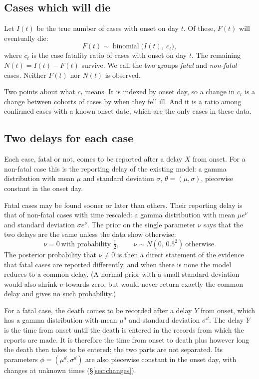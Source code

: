 \documentclass[11pt,a4paper]{article}
\newcommand{\bin}{\operatorname{binomial}}
\begin{document}
\subsection{Cases which will die}

Let $I(t)$ be the true number of cases with onset on day $t$. Of these,
$F(t)$ will eventually die:
\begin{equation}
F(t)\sim\bin\bigl(I(t),\ c_t\bigr),
\label{eq:cfr}
\end{equation}
where $c_t$ is the case fatality ratio of cases with onset on day $t$. The
remaining $N(t)=I(t)-F(t)$ survive. We call the two groups \emph{fatal} and
\emph{non-fatal} cases. Neither $F(t)$ nor $N(t)$ is observed.

Two points about what $c_t$ means. It is indexed by onset day, so a change in
$c_t$ is a change between cohorts of cases by when they fell ill. And it is a
ratio among confirmed cases with a known onset date, which are the only cases
in these data.

\subsection{Two delays for each case}

Each case, fatal or not, comes to be reported after a delay $X$ from onset.
For a non-fatal case this is the reporting delay of the existing model: a
gamma distribution with mean $\mu$ and standard deviation $\sigma$,
$\theta=(\mu,\sigma)$, piecewise constant in the onset day.

Fatal cases may be found sooner or later than others. Their reporting delay
is that of non-fatal cases with time rescaled: a gamma distribution with
mean $\mu e^{\nu}$ and standard deviation $\sigma e^{\nu}$. The prior on the single parameter $\nu$ says that the two
delays are the same unless the data show otherwise:
\begin{equation}
\nu=0\ \text{with probability } \tfrac12,\qquad
\nu\sim N(0,\,0.5^2)\ \text{otherwise}.
\label{eq:nu}
\end{equation}
The posterior probability that $\nu\ne 0$ is then a direct statement of the
evidence that fatal cases are reported differently, and when there is none
the model reduces to a common delay. (A normal prior with a small standard
deviation would also shrink $\nu$ towards zero, but would never return
exactly the common delay and gives no such probability.)

For a fatal case, the death comes to be recorded after a delay $Y$ from
onset, which has a gamma distribution with mean $\mu^{d}$ and standard
deviation $\sigma^{d}$. The delay $Y$ is the time from onset until the death is entered in the records from which the reports are made. It is therefore the time from onset to death plus however long the death then takes to be entered; the two parts are not separated. Its parameters
$\phi=(\mu^{d},\sigma^{d})$ are also piecewise constant in the onset day,
with changes at unknown times (\S\ref{sec:changes}).
\end{document}
